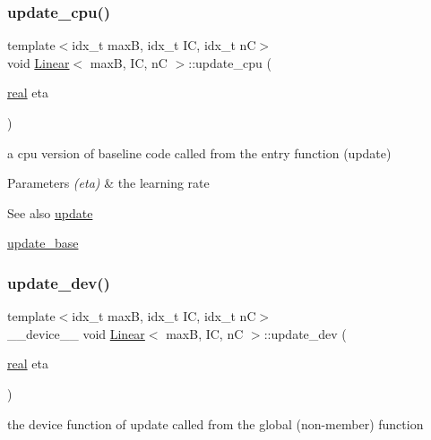 \subsubsection{\texorpdfstring{update\+\_\+cpu()}{update\_cpu()}}
{\footnotesize\ttfamily template$<$idx\+\_\+t maxB, idx\+\_\+t IC, idx\+\_\+t nC$>$ \\
void \hyperlink{structLinear}{Linear}$<$ maxB, IC, nC $>$\+::update\+\_\+cpu (\begin{DoxyParamCaption}\item[{\hyperlink{vgg__util_8h_a1082d08aaa761215ec83e7149f27ad16}{real}}]{eta }\end{DoxyParamCaption})\hspace{0.3cm}{\ttfamily [inline]}}



a cpu version of baseline code called from the entry function (update) 


\begin{DoxyParams}{Parameters}
{\em (eta)} & the learning rate \\
\hline
\end{DoxyParams}
\begin{DoxySeeAlso}{See also}
\hyperlink{structLinear_a828a72af0a1ccac904325ee280dbefa4}{update} 

\hyperlink{structLinear_aa59e1addd962ac7a70993229534ab899}{update\+\_\+base} 
\end{DoxySeeAlso}
\mbox{\label{structLinear_ad45413b0c13ca0ca89db6a3217a8b00b}} 
\subsubsection{\texorpdfstring{update\+\_\+dev()}{update\_dev()}}
{\footnotesize\ttfamily template$<$idx\+\_\+t maxB, idx\+\_\+t IC, idx\+\_\+t nC$>$ \\
\+\_\+\+\_\+device\+\_\+\+\_\+ void \hyperlink{structLinear}{Linear}$<$ maxB, IC, nC $>$\+::update\+\_\+dev (\begin{DoxyParamCaption}\item[{\hyperlink{vgg__util_8h_a1082d08aaa761215ec83e7149f27ad16}{real}}]{eta }\end{DoxyParamCaption})\hspace{0.3cm}{\ttfamily [inline]}}



the device function of update called from the global (non-\/member) function 


